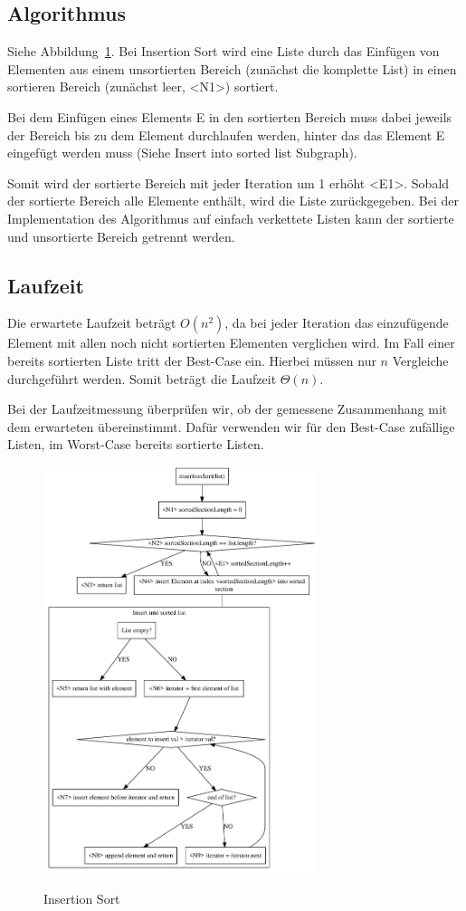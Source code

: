 \documentclass[11pt]{article}
\begin{document}
    \subsection{Algorithmus}\label{subsec:Ialgorithmus}
    Siehe Abbildung~\ref{fig:insertionS}.
    Bei Insertion Sort wird eine Liste durch das Einfügen von Elementen aus
    einem unsortierten Bereich (zunächst die komplette List) in einen sortieren
    Bereich (zunächst leer, <N1>) sortiert.

    Bei dem Einfügen eines Elements E in den sortierten Bereich muss dabei
    jeweils der Bereich bis zu dem Element durchlaufen werden, hinter das das
    Element E eingefügt werden muss (Siehe \frqq Insert into sorted list\flqq
    Subgraph).

    Somit wird der sortierte Bereich mit jeder Iteration um 1 erhöht <E1>.
    Sobald der sortierte Bereich alle Elemente enthält, wird die Liste
    zurückgegeben.
    Bei der Implementation des Algorithmus auf einfach verkettete Listen
    kann der sortierte und unsortierte Bereich getrennt werden.

    \subsection{Laufzeit}\label{subsec:Ilaufzeit}
    Die erwartete Laufzeit beträgt \(O(n^2)\), da bei jeder Iteration das
    einzufügende Element mit allen noch nicht sortierten Elementen verglichen
    wird.
    Im Fall einer bereits sortierten Liste tritt der Best-Case ein.
    Hierbei müssen nur \(n\) Vergleiche durchgeführt werden.
    Somit beträgt die Laufzeit \(\Theta(n)\).

    Bei der Laufzeitmessung überprüfen wir, ob der gemessene Zusammenhang mit
    dem erwarteten übereinstimmt.
    Dafür verwenden wir für den Best-Case zufällige Listen, im Worst-Case
    bereits sortierte Listen.

    \begin{figure}[hbt]
        \caption{Insertion Sort}
        \centering
        \includegraphics[width = 8cm]{insertionS}\label{fig:insertionS}
    \end{figure}
\end{document}
